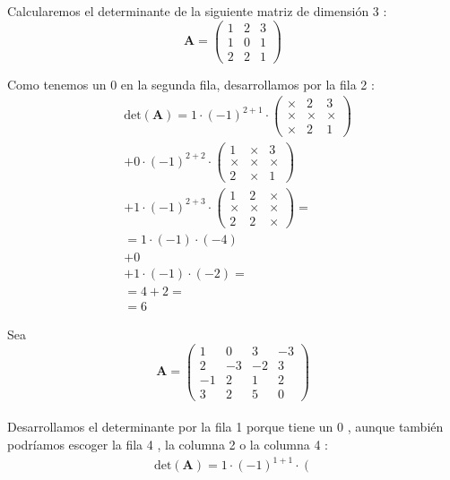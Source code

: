 \begin{}
\begin{example}
Calcularemos el determinante de la siguiente matriz de dimensión 3 :
$$
\boldsymbol{A}=\left(\begin{array}{lll}
1 & 2 & 3 \\
1 & 0 & 1 \\
2 & 2 & 1
\end{array}\right)
$$

Como tenemos un 0 en la segunda fila, desarrollamos por la fila 2 :
$$
\begin{aligned}
&\text{det}(\boldsymbol{A}) =1 \cdot(-1)^{2+1} \cdot\left(\begin{array}{ccc}
\times & 2 & 3 \\
\times & \times & \times \\
\times & 2 & 1
\end{array}\right) \\
& +0 \cdot(-1)^{2+2} \cdot\left(\begin{array}{ccc}
1 & \times & 3 \\
\times & \times & \times \\
2 & \times & 1
\end{array}\right) \\
& +1 \cdot(-1)^{2+3} \cdot\left(\begin{array}{lll}
1 & 2 & \times \\
\times & \times & \times \\
2 & 2 & \times
\end{array}\right)= \\
& =1 \cdot(-1) \cdot(-4) \\
& +0 \\
& +1 \cdot(-1) \cdot(-2)= \\
& =4+2= \\
& =6
\end{aligned}
$$  
\end{example}
\begin{example}
Sea  $$\boldsymbol{A}=\left(\begin{array}{rrrr}
1 & 0 & 3 & -3 \\
2 & -3 & -2 & 3 \\
-1 & 2 & 1 & 2 \\
3 & 2 & 5 & 0
\end{array}\right) $$\\
Desarrollamos el determinante por la fila 1 porque tiene un 0 , aunque también podríamos escoger la fila 4 , la columna 2 o la columna 4 :
$$
\begin{aligned}
&\text{det}(\boldsymbol{A}) =1 \cdot(-1)^{1+1} \cdot\left(\begin{array}{ccc}

\end{array}
\end{aligned}$$
\end{example}
\end{}
